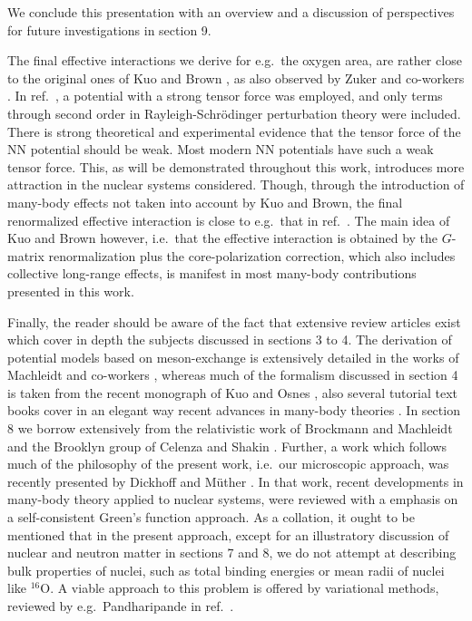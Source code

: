 We conclude this presentation with an
overview and a discussion of perspectives for future investigations
in section 9.

The final effective interactions we derive for e.g.\ the oxygen 
area, are rather close to the original ones of Kuo and Brown
\cite{kb66}, as also
observed by Zuker and co-workers \cite{acz91}. 
In ref.\ \cite{kb66},
a potential with a strong tensor force was employed, and only
terms through second order in Rayleigh-Schr\"{o}dinger perturbation
theory were included. There is strong
theoretical and experimental evidence that the tensor
force of the  NN potential should be weak. Most modern
NN potentials have such a weak tensor force. This, as will be
demonstrated throughout this work, introduces more attraction
in the nuclear systems considered. Though, through the
introduction of many-body effects not taken into account
by Kuo and Brown, the final renormalized effective interaction
is close to e.g.\ that  in ref.\ \cite{kb66}. The main idea
of Kuo and Brown however, i.e.\ that the effective interaction 
is obtained by the $G$-matrix renormalization plus
the core-polarization correction, which also includes
collective long-range effects, is manifest in most many-body
contributions presented in this work.



Finally, the reader should be aware of the fact
that extensive review articles
exist which cover in depth the subjects discussed in sections
3 to 4.
The derivation of potential models based on meson-exchange is
extensively detailed in the works of Machleidt and co-workers
\cite{mhe87,mac89}, whereas much of the formalism discussed in section
4 is taken from the recent monograph of Kuo and Osnes \cite{ko90},
also several tutorial text books cover in an elegant way recent advances
in many-body theories \cite{no88,br86,lm85,kap88}.
In section 8 we borrow extensively from the relativistic work
of Brockmann and Machleidt \cite{bm90} and the Brooklyn group
of Celenza and Shakin \cite{brook}.
Further, a work which follows much of
the philosophy of the present work, i.e.\
our microscopic approach, was recently
presented by Dickhoff and M\"{u}ther \cite{dm92}.
In that work, recent developments
in many-body theory applied to nuclear systems, were reviewed with a
emphasis on a self-consistent Green's function approach.
As a collation, it ought to be mentioned that in the present approach,
except for an illustratory discussion of nuclear and neutron matter in
sections 7 and 8,
we do not attempt at describing bulk properties of
nuclei, such as total binding energies or mean radii of nuclei like
$^{16}$O. A viable approach to this problem is offered by
variational methods, reviewed  by e.g.\ Pandharipande in ref.\
\cite{pand93}.

